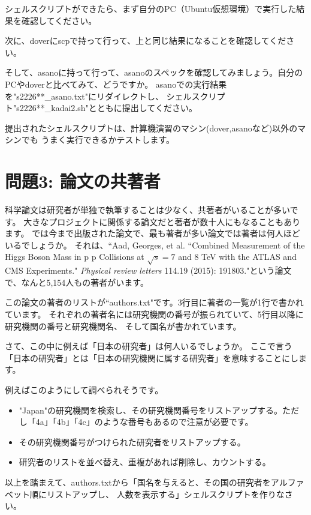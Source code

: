 \documentclass[a4j]{ltjreport}
\begin{document}
    シェルスクリプトができたら、まず自分のPC（Ubuntu仮想環境）で実行した結果を確認してください。

    次に、doverにscpで持って行って、上と同じ結果になることを確認してください。

    そして、asanoに持って行って、asanoのスペックを確認してみましょう。自分のPCやdoverと比べてみて、どうですか。
    asanoでの実行結果を"s2226**\_asano.txt"にリダイレクトし、
    シェルスクリプト"s2226**\_kadai2.sh"とともに提出してください。

    提出されたシェルスクリプトは、計算機演習のマシン(dover,asanoなど)以外のマシンでも
    うまく実行できるかテストします。

    \section*{問題3: 論文の共著者}
    科学論文は研究者が単独で執筆することは少なく、共著者がいることが多いです。
    大きなプロジェクトに関係する論文だと著者が数十人にもなることもあります。
    では今まで出版された論文で、最も著者が多い論文では著者は何人ほどいるでしょうか。
    それは、``Aad, Georges, et al. ``Combined Measurement of the Higgs Boson Mass in p p Collisions at $\sqrt{s} = 7$ and $8$ TeV with the ATLAS and CMS Experiments." \textit{Physical review letters} 114.19 (2015): 191803."という論文で、なんと5,154人もの著者がいます。

    この論文の著者のリストが``authors.txt"です。3行目に著者の一覧が1行で書かれています。
    それぞれの著者名には研究機関の番号が振られていて、5行目以降に研究機関の番号と研究機関名、
    そして国名が書かれています。

    さて、この中に例えば「日本の研究者」は何人いるでしょうか。
    ここで言う「日本の研究者」とは「日本の研究機関に属する研究者」を意味することにします。

    例えばこのようにして調べられそうです。
    \begin{itemize} 
        \item "Japan"の研究機関を検索し、その研究機関番号をリストアップする。ただし「4a」「4b」「4c」のような番号もあるので注意が必要です。
        \item その研究機関番号がつけられた研究者をリストアップする。
        \item 研究者のリストを並べ替え、重複があれば削除し、カウントする。
    \end{itemize}

    以上を踏まえて、authors.txtから「国名を与えると、その国の研究者をアルファベット順にリストアップし、
    人数を表示する」シェルスクリプトを作りなさい。
\end{document}
